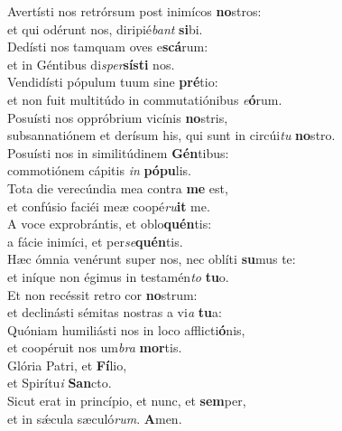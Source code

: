 \evenverse Avertísti nos retrórsum post inimícos \textbf{no}stros:~\*\\
\evenverse et qui odérunt nos, diripié\textit{bant} \textbf{si}bi.\\
\oddverse Dedísti nos tamquam oves e\textbf{scá}rum:~\*\\
\oddverse et in Géntibus di\textit{sper}\textbf{sí}\textbf{sti} nos.\\
\evenverse Vendidísti pópulum tuum sine \textbf{pré}tio:~\*\\
\evenverse et non fuit multitúdo in commutatiónibus \textit{e}\textbf{ó}rum.\\
\oddverse Posuísti nos oppróbrium vicínis \textbf{no}stris,~\*\\
\oddverse subsannatiónem et derísum his, qui sunt in circúi\textit{tu} \textbf{no}stro.\\
\evenverse Posuísti nos in similitúdinem \textbf{Gén}tibus:~\*\\
\evenverse commotiónem cápitis \textit{in} \textbf{pó}\textbf{pu}lis.\\
\oddverse Tota die verecúndia mea contra \textbf{me} est,~\*\\
\oddverse et confúsio faciéi meæ coopé\textit{ru}\textbf{it} me.\\
\evenverse A voce exprobrántis, et oblo\textbf{quén}tis:~\*\\
\evenverse a fácie inimíci, et per\textit{se}\textbf{quén}tis.\\
\oddverse Hæc ómnia venérunt super nos, nec oblíti \textbf{su}mus te:~\*\\
\oddverse et iníque non égimus in testamén\textit{to} \textbf{tu}o.\\
\evenverse Et non recéssit retro cor \textbf{no}strum:~\*\\
\evenverse et declinásti sémitas nostras a vi\textit{a} \textbf{tu}a:\\
\oddverse Quóniam humiliásti nos in loco afflicti\textbf{ó}nis,~\*\\
\oddverse et coopéruit nos um\textit{bra} \textbf{mor}tis.\\
\evenverse Glória Patri, et \textbf{Fí}lio,~\*\\
\evenverse et Spirítu\textit{i} \textbf{San}cto.\\
\oddverse Sicut erat in princípio, et nunc, et \textbf{sem}per,~\*\\
\oddverse et in sǽcula sæculó\textit{rum}. \textbf{A}men.\\
